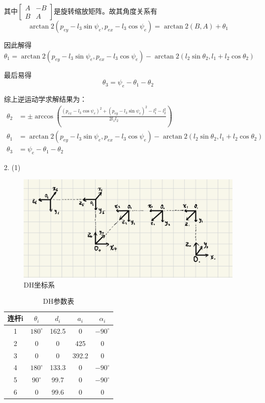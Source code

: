 \documentclass[UTF8, 13pt]{ctexart}
\begin{document}
其中\(\begin{bmatrix} A & -B \\ B & A \end{bmatrix}\)是旋转缩放矩阵。故其角度关系有
\[
\arctan2(p_{ey} - l_3 \sin\psi_e, p_{ex} - l_3 \cos\psi_e) = \arctan2(B, A) + \theta_1
\]

因此解得
\[
\theta_1 = \arctan2(p_{ey} - l_3 \sin\psi_e, p_{ex} - l_3 \cos\psi_e) - \arctan2(l_2 \sin\theta_2, l_1 + l_2 \cos\theta_2)
\]
\vspace{0.5em}

最后易得
\[
\theta_3 = \psi_e - \theta_1 - \theta_2
\]
\vspace{0.5em}

综上逆运动学求解结果为：
\[
\begin{aligned}
\theta_2 &= \pm \arccos\left(\frac{(p_{ex} - l_3 \cos\psi_e)^2 + (p_{ey} - l_3 \sin\psi_e)^2 - l_1^2 - l_2^2}{2l_1l_2}\right) \\
\theta_1 &= \arctan2(p_{ey} - l_3 \sin\psi_e, p_{ex} - l_3 \cos\psi_e) - \arctan2(l_2 \sin\theta_2, l_1 + l_2 \cos\theta_2) \\
\theta_3 &= \psi_e - \theta_1 - \theta_2
\end{aligned}
\]
\newpage

2.
(1)
\begin{figure}[h]
    \centering
    \includegraphics[width=1.0\textwidth]{asset/DH_coor.png}
    \caption{DH坐标系}
\end{figure}
\begin{table}[h]
    \centering
    \begin{tabular}{|c|c|c|c|c|}
        \hline
        连杆i & \(\theta_i\) & \(d_i\) & \(a_i\) & \(\alpha_i\) \\
        \hline
        1 & $180^\circ$ & 162.5 & 0 & $-90^\circ$ \\
        \hline
        2 & 0 & 0 & 425 & 0 \\
        \hline
        3 & 0 & 0 & 392.2 & 0 \\
        \hline
        4 & $180^\circ$ & 133.3 & 0 & $-90^\circ$ \\
        \hline
        5 & $90^\circ$ & 99.7 & 0 & $-90^\circ$ \\
        \hline
        6 & 0 & 99.6 & 0 & 0 \\
        \hline
    \end{tabular}
    \caption{DH参数表}
\end{table}
\vspace{1em}
\end{document}
